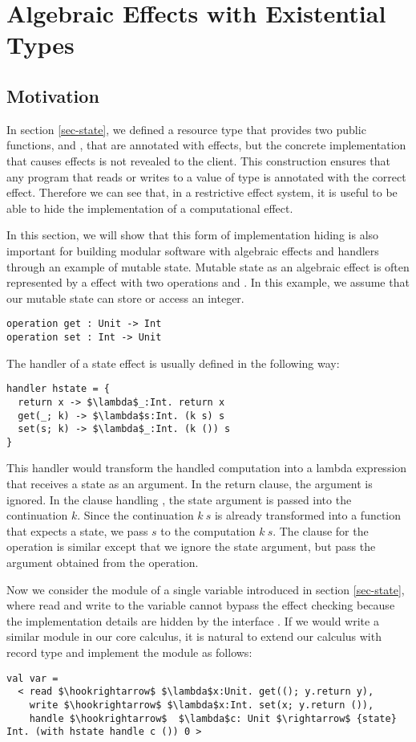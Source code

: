 
\chapter{Algebraic Effects with Existential Types}
\section{Motivation}
In section \ref{sec-state}, we defined a resource type  that provides two public functions,  and , that are annotated with effects, but the concrete implementation that causes effects is not revealed to the client. This construction ensures that any program that reads or writes to a value of type  is annotated with the correct effect. Therefore we can see that, in a restrictive effect system, it is useful to be able to hide the implementation of a computational effect.  

In this section, we will show that this form of implementation hiding is also important for building modular software with algebraic effects and handlers through an example of mutable state. Mutable state as an algebraic effect is often represented by a  effect with two operations  and . In this example, we assume that our mutable state can store or access an integer.
\begin{lstlisting}
operation get : Unit -> Int
operation set : Int -> Unit
\end{lstlisting}

The handler of a state effect is usually defined in the following way:
\begin{lstlisting}[mathescape=true]
handler hstate = {
  return x -> $\lambda$_:Int. return x
  get(_; k) -> $\lambda$s:Int. (k s) s
  set(s; k) -> $\lambda$_:Int. (k ()) s
}
\end{lstlisting}
This handler would transform the handled computation into a lambda expression that receives a state as an argument. In the return clause, the argument is ignored. In the clause handling ,  the state argument is passed into the continuation $k$. Since the continuation $k\ s$ is already transformed into a function that expects a state, we pass $s$ to the computation $k\ s$. The clause for the  operation is similar except that we ignore the state argument, but pass the argument obtained from the  operation. 

Now we consider the module of a single variable introduced in section \ref{sec-state}, where read and write to the variable cannot bypass the effect checking because the implementation details are hidden by the interface . If we would write a similar module in our core calculus, it is natural to extend our calculus with record type and implement the module as follows:
\begin{lstlisting}[mathescape=true]
val var = 
  < read $\hookrightarrow$ $\lambda$x:Unit. get((); y.return y),
    write $\hookrightarrow$ $\lambda$x:Int. set(x; y.return ()),
    handle $\hookrightarrow$  $\lambda$c: Unit $\rightarrow$ {state} Int. (with hstate handle c ()) 0 >
\end{lstlisting}


